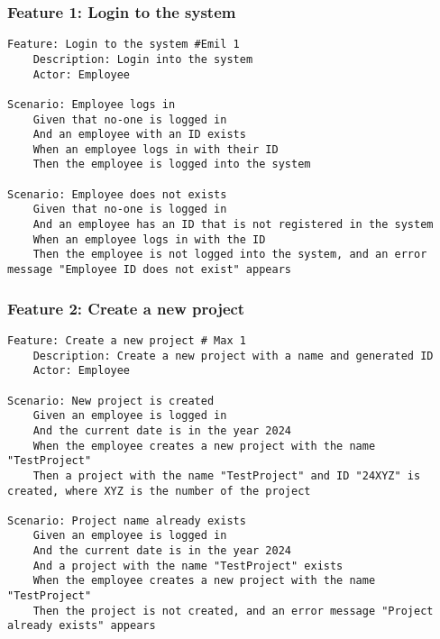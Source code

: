 \subsubsection{Feature 1: Login to the system} %
\begin{lstlisting} 
Feature: Login to the system #Emil 1
    Description: Login into the system
    Actor: Employee

Scenario: Employee logs in
    Given that no-one is logged in
    And an employee with an ID exists
    When an employee logs in with their ID
    Then the employee is logged into the system

Scenario: Employee does not exists
    Given that no-one is logged in
    And an employee has an ID that is not registered in the system
    When an employee logs in with the ID
    Then the employee is not logged into the system, and an error message "Employee ID does not exist" appears
\end{lstlisting}

\subsubsection{Feature 2: Create a new project}%
\begin{lstlisting}
Feature: Create a new project # Max 1
    Description: Create a new project with a name and generated ID
    Actor: Employee

Scenario: New project is created
    Given an employee is logged in
    And the current date is in the year 2024
    When the employee creates a new project with the name "TestProject"
    Then a project with the name "TestProject" and ID "24XYZ" is created, where XYZ is the number of the project

Scenario: Project name already exists
    Given an employee is logged in
    And the current date is in the year 2024
    And a project with the name "TestProject" exists
    When the employee creates a new project with the name "TestProject"
    Then the project is not created, and an error message "Project already exists" appears
\end{lstlisting}

